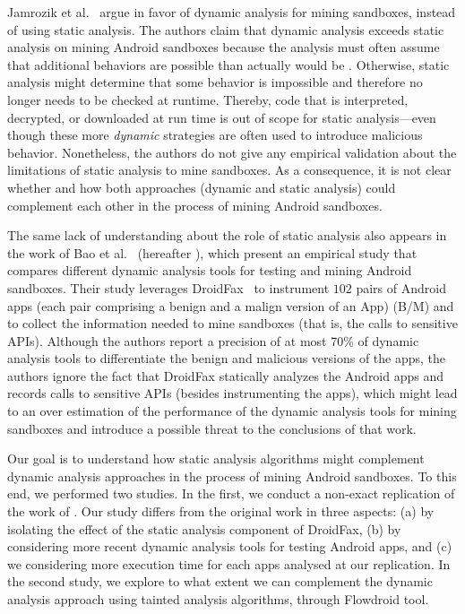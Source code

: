 Jamrozik et al.~\cite{DBLP:conf/icse/JamrozikSZ16} argue in favor of dynamic analysis for mining sandboxes, instead of using static analysis. The authors claim that dynamic analysis exceeds static analysis on mining Android sandboxes because the analysis must often assume that additional behaviors are possible than actually would be . Otherwise, static analysis might determine that some behavior is impossible and therefore no longer needs to be checked at runtime. Thereby, code that is interpreted, decrypted, or downloaded at run time is out of scope for static analysis---even though these more \emph{dynamic} strategies are often used to introduce malicious behavior. Nonetheless, the authors do not give any empirical validation about the limitations of static analysis to mine sandboxes. As a consequence, it is not clear whether and how both approaches (dynamic and static analysis) could complement each other in the process of mining Android sandboxes.

The same lack of understanding about the role of static analysis also appears in the work of Bao et al.~\cite{DBLP:conf/wcre/BaoLL18} (hereafter \blls), which present an empirical study that compares different dynamic analysis tools for testing and mining Android sandboxes. Their study leverages DroidFax~\cite{DBLP:conf/icsm/CaiR17a} to instrument $102$ pairs of Android apps (each pair comprising a benign and a malign version of an App) (B/M) and to collect the information needed to mine sandboxes (that is, the calls to sensitive APIs).
Although the authors report a precision of at most 70\% of dynamic analysis tools to differentiate the benign and malicious versions of the apps, the authors ignore the fact that DroidFax statically analyzes the Android apps and records calls to sensitive APIs (besides instrumenting the apps), which might lead to an over estimation of the performance of the dynamic analysis tools for mining sandboxes and introduce a possible threat to the conclusions of that work.

Our goal is to understand how static analysis
algorithms might complement dynamic analysis approaches in the process of mining Android sandboxes. To this end, we performed two studies. In the
first, we conduct a non-exact replication of the work of \blls. Our study differs from the original work in three aspects: (a)
by isolating the effect of the static analysis component of DroidFax, (b) by considering more recent dynamic analysis tools for testing Android apps,
and (c) we considering more execution time for each apps analysed at our replication. In the second study, we explore to what extent we can complement the dynamic analysis approach using tainted analysis algorithms, through Flowdroid \cite{DBLP:conf/pldi/ArztRFBBKTOM14} tool.


